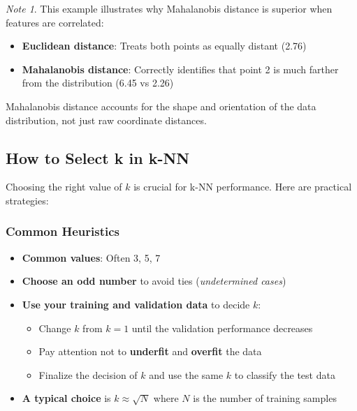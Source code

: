 \documentclass[11pt,a4paper]{article}
\theoremstyle{definition}
\theoremstyle{plain}
\theoremstyle{remark}
\newtheorem*{remark}{Note}
\begin{document}
\begin{remark}
This example illustrates why Mahalanobis distance is superior when features are correlated:
\begin{itemize}
    \item \textbf{Euclidean distance}: Treats both points as equally distant (2.76)
    \item \textbf{Mahalanobis distance}: Correctly identifies that point 2 is much farther from the distribution (6.45 vs 2.26)
\end{itemize}
Mahalanobis distance accounts for the shape and orientation of the data distribution, not just raw coordinate distances.
\end{remark}

\subsection{How to Select k in k-NN}

Choosing the right value of $k$ is crucial for k-NN performance. Here are practical strategies:

\subsubsection{Common Heuristics}

\begin{itemize}
    \item \textbf{Common values}: Often 3, 5, 7
    
    \item \textbf{Choose an odd number} to avoid ties (\textit{undetermined cases})
    
    \item \textbf{Use your training and validation data} to decide $k$:
    \begin{itemize}
        \item Change $k$ from $k=1$ until the validation performance decreases
        \item Pay attention not to \textbf{underfit} and \textbf{overfit} the data
        \item Finalize the decision of $k$ and use the same $k$ to classify the test data
    \end{itemize}
    
    \item \textbf{A typical choice} is $k \approx \sqrt{N}$ where $N$ is the number of training samples
\end{itemize}
\end{document}
